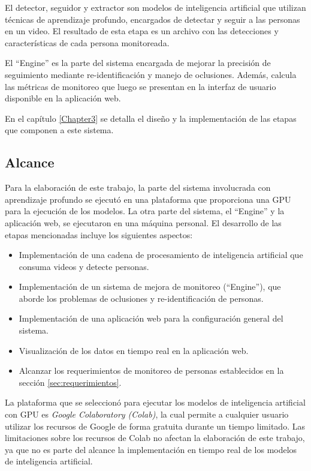 El detector, seguidor y extractor son modelos de inteligencia artificial que utilizan técnicas de aprendizaje profundo, encargados de detectar y seguir a las personas en un video. El resultado de esta etapa es un archivo con las detecciones y características de cada persona monitoreada. 

El ``Engine'' es la parte del sistema encargada de mejorar la precisión de seguimiento mediante re-identificación y manejo de oclusiones. Además, calcula las métricas de monitoreo que luego se presentan en la interfaz de usuario disponible en la aplicación web.

En el capítulo \ref{Chapter3} se detalla el diseño y la implementación de las etapas que componen a este sistema.

\subsection{Alcance}

Para la elaboración de este trabajo, la parte del sistema involucrada con aprendizaje profundo se ejecutó en una plataforma que proporciona una GPU para la ejecución de los modelos. La otra parte del sistema, el ``Engine'' y la aplicación web, se ejecutaron en una máquina personal. El desarrollo de las etapas mencionadas incluye los siguientes aspectos:
\begin{itemize}
\item Implementación de una cadena de procesamiento de inteligencia artificial que consuma videos  y detecte personas.
\item Implementación de un sistema de mejora de monitoreo (``Engine''), que aborde los problemas de oclusiones y re-identificación de personas.
\item Implementación de una aplicación web para la configuración general del sistema.
\item Visualización de los datos en tiempo real en la aplicación web.
\item Alcanzar los requerimientos de monitoreo de personas establecidos en la sección \ref{sec:requerimientos}.
\end{itemize}

La plataforma que se seleccionó para ejecutar los modelos de inteligencia artificial con GPU es \textit{Google Colaboratory (Colab)}, la cual permite a cualquier usuario utilizar los recursos de Google de forma gratuita durante un tiempo limitado. Las limitaciones sobre los recursos de Colab no afectan la elaboración de este trabajo, ya que no es parte del alcance la implementación en tiempo real de los modelos de inteligencia artificial.


